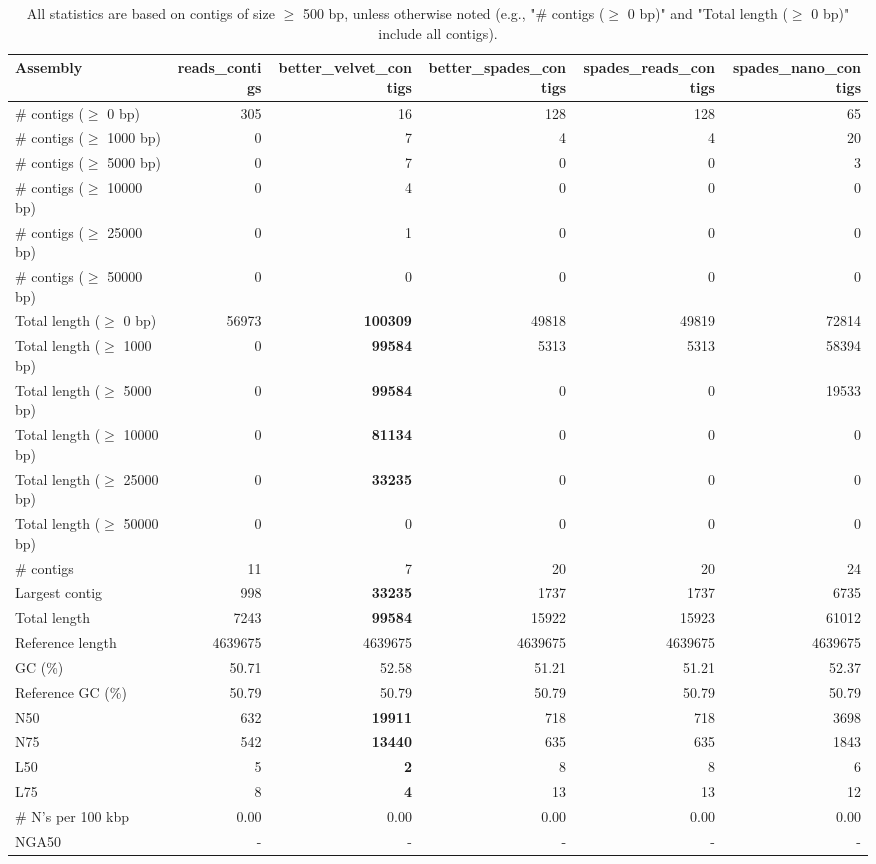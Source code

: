 \documentclass[12pt,a4paper]{article}
\begin{document}
\begin{table}[ht]
\begin{center}
\caption{All statistics are based on contigs of size $\geq$ 500 bp, unless otherwise noted (e.g., "\# contigs ($\geq$ 0 bp)" and "Total length ($\geq$ 0 bp)" include all contigs).}
\begin{tabular}{|l*{5}{|r}|}
\hline
Assembly & reads\_contigs & better\_velvet\_contigs & better\_spades\_contigs & spades\_reads\_contigs & spades\_nano\_contigs \\ \hline
\# contigs ($\geq$ 0 bp) & 305 & 16 & 128 & 128 & 65 \\ \hline
\# contigs ($\geq$ 1000 bp) & 0 & 7 & 4 & 4 & 20 \\ \hline
\# contigs ($\geq$ 5000 bp) & 0 & 7 & 0 & 0 & 3 \\ \hline
\# contigs ($\geq$ 10000 bp) & 0 & 4 & 0 & 0 & 0 \\ \hline
\# contigs ($\geq$ 25000 bp) & 0 & 1 & 0 & 0 & 0 \\ \hline
\# contigs ($\geq$ 50000 bp) & 0 & 0 & 0 & 0 & 0 \\ \hline
Total length ($\geq$ 0 bp) & 56973 & {\bf 100309} & 49818 & 49819 & 72814 \\ \hline
Total length ($\geq$ 1000 bp) & 0 & {\bf 99584} & 5313 & 5313 & 58394 \\ \hline
Total length ($\geq$ 5000 bp) & 0 & {\bf 99584} & 0 & 0 & 19533 \\ \hline
Total length ($\geq$ 10000 bp) & 0 & {\bf 81134} & 0 & 0 & 0 \\ \hline
Total length ($\geq$ 25000 bp) & 0 & {\bf 33235} & 0 & 0 & 0 \\ \hline
Total length ($\geq$ 50000 bp) & 0 & 0 & 0 & 0 & 0 \\ \hline
\# contigs & 11 & 7 & 20 & 20 & 24 \\ \hline
Largest contig & 998 & {\bf 33235} & 1737 & 1737 & 6735 \\ \hline
Total length & 7243 & {\bf 99584} & 15922 & 15923 & 61012 \\ \hline
Reference length & 4639675 & 4639675 & 4639675 & 4639675 & 4639675 \\ \hline
GC (\%) & 50.71 & 52.58 & 51.21 & 51.21 & 52.37 \\ \hline
Reference GC (\%) & 50.79 & 50.79 & 50.79 & 50.79 & 50.79 \\ \hline
N50 & 632 & {\bf 19911} & 718 & 718 & 3698 \\ \hline
N75 & 542 & {\bf 13440} & 635 & 635 & 1843 \\ \hline
L50 & 5 & {\bf 2} & 8 & 8 & 6 \\ \hline
L75 & 8 & {\bf 4} & 13 & 13 & 12 \\ \hline
\# N's per 100 kbp & 0.00 & 0.00 & 0.00 & 0.00 & 0.00 \\ \hline
NGA50 & - & - & - & - & - \\ \hline
\end{tabular}
\end{center}
\end{table}
\end{document}
